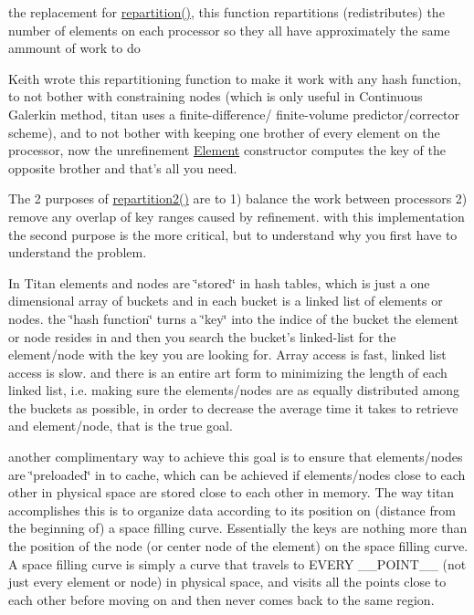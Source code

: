 the replacement for \hyperlink{extfun_8h_a27}{repartition()}, this function repartitions (redistributes) the number of elements on each processor so they all have approximately the same ammount of work to do 

Keith wrote this repartitioning function to make it work with any hash function, to not bother with constraining nodes (which is only useful in Continuous Galerkin method, titan uses a finite-difference/ finite-volume predictor/corrector scheme), and to not bother with keeping one brother of every element on the processor, now the unrefinement \hyperlink{classElement}{Element} constructor computes the key of the opposite brother and that's all you need.

The 2 purposes of \hyperlink{extfun_8h_a28}{repartition2()} are to 1) balance the work between processors 2) remove any overlap of key ranges caused by refinement. with this implementation the second purpose is the more critical, but to understand why you first have to understand the problem.

In Titan elements and nodes are \char`\"{}stored\char`\"{} in hash tables, which is just a one dimensional array of buckets and in each bucket is a linked list of elements or nodes. the \char`\"{}hash function\char`\"{} turns a \char`\"{}key\char`\"{} into the indice of the bucket the element or node resides in and then you search the bucket's linked-list for the element/node with the key you are looking for. Array access is fast, linked list access is slow. and there is an entire art form to minimizing the length of each linked list, i.e. making sure the elements/nodes are as equally distributed among the buckets as possible, in order to decrease the average time it takes to retrieve and element/node, that is the true goal.

another complimentary way to achieve this goal is to ensure that elements/nodes are \char`\"{}preloaded\char`\"{} in to cache, which can be achieved if elements/nodes close to each other in physical space are stored close to each other in memory. The way titan accomplishes this is to organize data according to its position on (distance from the beginning of) a space filling curve. Essentially the keys are nothing more than the position of the node (or center node of the element) on the space filling curve. A space filling curve is simply a curve that travels to EVERY \_\-\_\-POINT\_\-\_\- (not just every element or node) in physical space, and visits all the points close to each other before moving on and then never comes back to the same region.

